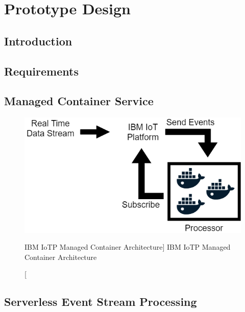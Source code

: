 \chapter{Prototype Design}


\section{Introduction}


\section{Requirements}


\section{Managed Container Service}

\begin{figure}[ht]
    \includegraphics[width=0.6\linewidth]{images/streaming/containerArch.png}\centering
    \caption
    [IBM IoTP Managed Container Architecture]
    {IBM IoTP Managed Container Architecture}
    \label{fig:iotpManagedContainer}
\end{figure}


\section{Serverless Event Stream Processing}

